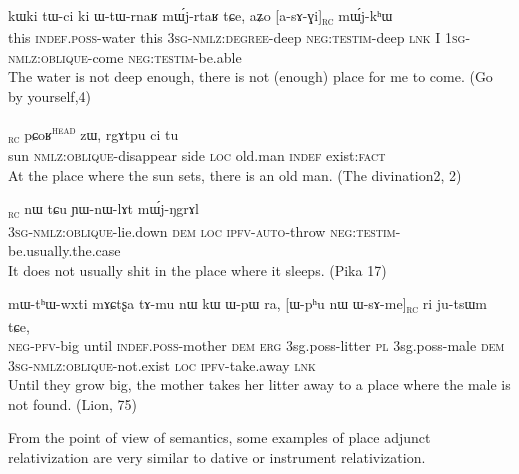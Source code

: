 \documentclass[oldfontcommands,oneside,a4paper,11pt]{article}
\newcommand{\ipa}[1]{{\phon #1}} %
\newcommand{\topic}{\textsc{dem}}
\newcommand{\tete}{\textsuperscript{\textsc{head}}}
\newcommand{\rc}{\textsubscript{\textsc{rc}}}
\begin{document}
\begin{exe}
   \ex \label{ex:asAGi}
 \gll
\ipa{kɯki}   	\ipa{tɯ-ci}   	\ipa{ki}   	\ipa{ɯ-tɯ-rnaʁ}   	\ipa{mɯ́j-rtaʁ}   	\ipa{tɕe,}   	\ipa{aʑo}   	[\ipa{a-sɤ-ɣi}]\rc{}   	\ipa{mɯ́j-kʰɯ}   \\
this \textsc{indef.poss}-water this \textsc{3sg-nmlz:degree}-deep \textsc{neg:testim}-deep \textsc{lnk} I \textsc{1sg-nmlz:oblique}-come \textsc{neg:testim}-be.able \\
\glt The water is not deep enough, there is not (enough) place for me to come. (Go by yourself,4)
\end{exe}


\begin{exe}
   \ex \label{ex:tANe}
 \gll [\ipa{tɤŋe}   	\ipa{sɤ-ɕqʰlɤt}]\rc{}   	\ipa{pɕoʁ}\tete{}   	\ipa{zɯ,}   	\ipa{rgɤtpu}   	\ipa{ci}   	\ipa{tu}   \\
sun \textsc{nmlz:oblique}-disappear side \textsc{loc} old.man \textsc{indef} exist:\textsc{fact} \\
\glt At the place where the sun sets, there is an old man. (The divination2, 2)
\end{exe}
\begin{exe}
   \ex \label{ex:WsArNgW}
 \gll
[\ipa{ɯ-sɤ-rŋgɯ}]\rc{}   	\ipa{nɯ} \ipa{tɕu}   	\ipa{ɲɯ-nɯ-lɤt}   	\ipa{mɯ́j-ŋgrɤl}   \\
\textsc{3sg-nmlz:oblique}-lie.down \textsc{dem} \textsc{loc} \textsc{ipfv-auto}-throw \textsc{neg:testim}-be.usually.the.case \\
\glt  It  does not usually shit in the place where it sleeps. (Pika 17)
\end{exe}

\begin{exe}
   \ex \label{ex:WsAme}
 \gll
\ipa{mɯ-tʰɯ-wxti}   	\ipa{mɤɕtʂa}   	\ipa{tɤ-mu}   	\ipa{nɯ}   	\ipa{kɯ}   	\ipa{ɯ-pɯ}   	\ipa{ra,}   	[\ipa{ɯ-pʰu}   	\ipa{nɯ}   	\ipa{ɯ-sɤ-me}]\rc{}   	\ipa{ri}   	\ipa{ju-tsɯm}   	\ipa{tɕe,}   \\
\textsc{neg-pfv}-big until \textsc{indef.poss}-mother \topic{} \textsc{erg}  {3sg.poss}-litter \textsc{pl}  {3sg.poss}-male \topic{} \textsc{3sg-nmlz:oblique}-not.exist  \textsc{loc} \textsc{ipfv}-take.away \textsc{lnk} \\
\glt  Until they grow big, the mother takes her litter away to a place where the male is not found. (Lion, 75)
  \end{exe}
From the point of view of semantics, some examples of place adjunct relativization are very similar to dative or instrument relativization. 
\end{document}
